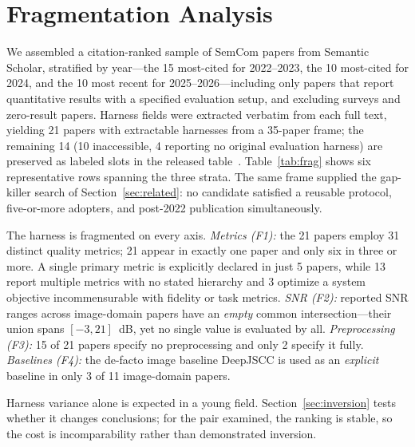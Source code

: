 \documentclass[conference]{IEEEtran}
\begin{document}
\section{Fragmentation Analysis}\label{sec:frag}
We assembled a citation-ranked sample of SemCom papers from Semantic Scholar,
stratified by year---the 15 most-cited for 2022--2023, the 10 most-cited for 2024,
and the 10 most recent for 2025--2026---including only papers that report quantitative
results with a specified evaluation setup, and excluding surveys and zero-result
papers. Harness fields were extracted verbatim from each full text, yielding 21 papers
with extractable harnesses from a 35-paper frame; the remaining 14 (10 inaccessible,
4 reporting no original evaluation harness) are preserved as labeled slots in the
released table~\cite{repo}. Table~\ref{tab:frag} shows six representative rows spanning
the three strata. The same frame supplied the gap-killer search of
Section~\ref{sec:related}: no candidate satisfied a reusable protocol, five-or-more
adopters, and post-2022 publication simultaneously.

The harness is fragmented on every axis. \emph{Metrics (F1):} the 21 papers employ
31 distinct quality metrics; 21 appear in exactly one paper and only six in three or
more. A single primary metric is explicitly declared in just 5 papers, while 13 report
multiple metrics with no stated hierarchy and 3 optimize a system objective
incommensurable with fidelity or task metrics. \emph{SNR (F2):} reported SNR ranges
across image-domain papers have an \emph{empty} common intersection---their union
spans $[-3,21]$~dB, yet no single value is evaluated by all.
\emph{Preprocessing (F3):} 15 of 21 papers specify no preprocessing and only 2 specify
it fully. \emph{Baselines (F4):} the de-facto image baseline DeepJSCC is used as an
\emph{explicit} baseline in only 3 of 11 image-domain papers.

Harness variance alone is expected in a young field. Section~\ref{sec:inversion} tests
whether it changes conclusions; for the pair examined, the ranking is stable, so the cost
is incomparability rather than demonstrated inversion.
\end{document}
